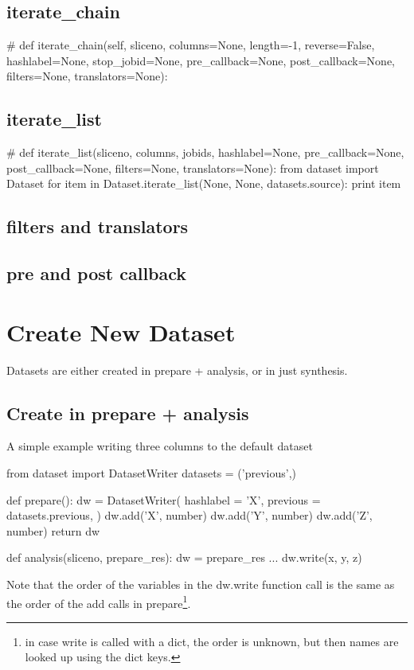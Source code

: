\subsection{iterate\_chain}
\begin{python}
# def iterate_chain(self, sliceno, columns=None, length=-1, reverse=False, hashlabel=None, stop_jobid=None, pre_callback=None, post_callback=None, filters=None, translators=None):
\end{python}



\subsection{iterate\_list}
\begin{python}
  # def iterate_list(sliceno, columns, jobids, hashlabel=None, pre_callback=None, post_callback=None, filters=None, translators=None):
  from dataset import Dataset
  for item in Dataset.iterate_list(None, None, datasets.source):
    print item
\end{python}

\subsection{filters and translators}

\subsection{pre and post callback}

\section{Create New Dataset}
Datasets are either created in prepare + analysis, or in just
synthesis.

\subsection{Create in prepare + analysis}
A simple example writing three columns to the default dataset

\begin{python}
from dataset import DatasetWriter
datasets = ('previous',)

def prepare():
  dw = DatasetWriter(
    hashlabel = 'X',
    previous = datasets.previous,
  )
  dw.add('X', number)
  dw.add('Y', number)
  dw.add('Z', number)
  return dw

def analysis(sliceno, prepare_res):
  dw = prepare_res
  ...
  dw.write(x, y, z)
\end{python}
Note that the order of the variables in the dw.write function call is
the same as the order of the add calls in prepare\footnote{in case
  write is called with a dict, the order is unknown, but then names
  are looked up using the dict keys.}.

